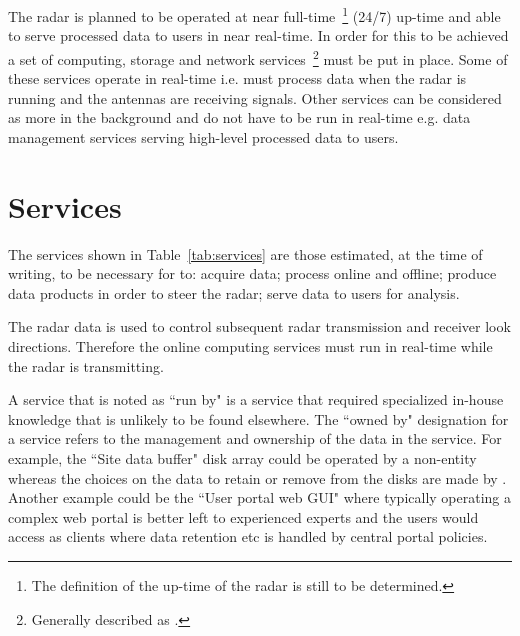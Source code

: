 \documentclass[12pt,a4paper]{article}
\begin{document}
The \ED radar is planned to be operated at near full-time~\footnote{The definition of the up-time of the \ED radar is still to be determined.} (24/7) up-time and able to serve processed data to users in near real-time.
In order for this to be achieved a set of computing, storage and network services~\footnote{Generally described as \einfra.} must be put in place.
Some of these \einfra services operate in real-time i.e. must process data when the radar is running and the antennas are receiving signals.
Other \einfra services can be considered as more in the background and
do not have to be run in real-time e.g. data management services serving high-level processed data to \ED users.

\newlength{\mycolwidth}
\setlength{\mycolwidth}{3.0cm}


% 

\section{\ED \einfra Services}

The services shown in Table~\ref{tab:services} are those estimated, at the time of writing, to be necessary for \ED to: acquire data; process online and offline; produce data products in order to steer the radar; serve data to users for analysis.

The radar data is used to control subsequent radar transmission and receiver look directions.
Therefore the online computing services must run in real-time while the radar is transmitting.

A service that is noted as ``run by" \EC is a service that required specialized in-house knowledge that is unlikely to be found elsewhere.
The ``owned by" designation for a service refers to the management and ownership of the data in the service.
For example, the ``Site data buffer" disk array could be operated by a non-\EC entity whereas the choices on the data to retain or remove from the disks are made by \EC.
Another example could be the ``User portal web GUI" where typically operating a complex web portal is better left to experienced experts and the \EC users would access as clients where data retention etc is handled by central portal policies.
\end{document}
